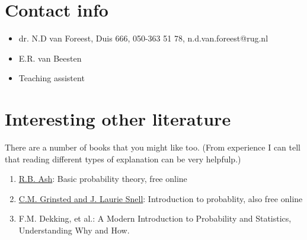 \documentclass[a4paper]{article}
\theoremstyle{definition}
\newcommand{\1}[1]{\,I_{#1}} %
\begin{document}
\section{Contact info}
\label{sec:org1ef526d}

\begin{itemize}
\item dr. N.D van Foreest, Duis 666, 050-363 51 78, n.d.van.foreest@rug.nl
\item E.R. van Beesten
\item Teaching assistent
\end{itemize}



\section{Interesting other literature}
\label{sec:orgc531310}

There are a number of books that you might like too. (From experience I can tell that reading different types of explanation can be very helpfulp.)
\begin{enumerate}
\item \href{https://faculty.math.illinois.edu/\~r-ash/BPT.html}{R.B. Ash}: Basic probability theory, free online
\item \href{https://math.dartmouth.edu/\~prob/prob/prob.pdf}{C.M. Grinsted and J. Laurie Snell}: Introduction to probablity, also free online
\item F.M. Dekking, et al.: A Modern Introduction to Probability and Statistics, Understanding Why and How.
\end{enumerate}
\end{document}
